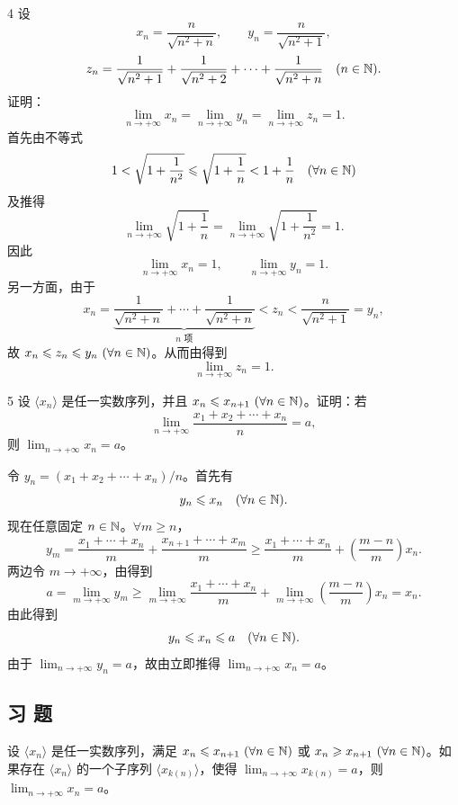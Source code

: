 \begin{sourceexample}{4}
设
\[
x_n=\frac{n}{\sqrt{n^2+n}},\qquad
y_n=\frac{n}{\sqrt{n^2+1}},
\]
\[
z_n=\frac1{\sqrt{n^2+1}}+\frac1{\sqrt{n^2+2}}+\cdots+\frac1{\sqrt{n^2+n}}
\quad(n\in\mathbb{N}).
\]
证明：
\[
\lim_{n\to+\infty}x_n=\lim_{n\to+\infty}y_n=\lim_{n\to+\infty}z_n=1.
\]
首先由不等式
\[
1<\sqrt{1+\frac1{n^2}}\leqslant\sqrt{1+\frac1n}<1+\frac1n
\quad(\forall n\in\mathbb{N})
\]
及推得
\[
\lim_{n\to+\infty}\sqrt{1+\frac1n}
=\lim_{n\to+\infty}\sqrt{1+\frac1{n^2}}=1.
\]
因此
\[
\lim_{n\to+\infty}x_n=1,\qquad \lim_{n\to+\infty}y_n=1.
\]
另一方面，由于
\[
x_n=\underbrace{\frac1{\sqrt{n^2+n}}+\cdots+\frac1{\sqrt{n^2+n}}}_{n\text{ 项}}
<z_n<\frac{n}{\sqrt{n^2+1}}=y_n,
\]
故 \(x_n\leqslant z_n\leqslant y_n\ (\forall n\in\mathbb{N})\)。从而由得到
\[
\lim_{n\to+\infty}z_n=1.
\]
\end{sourceexample}

\begin{sourceexample}{5}
设 \(\langle x_n\rangle\) 是任一实数序列，并且
\(x_n\leqslant x_{n+1}\ (\forall n\in\N)\)。证明：若
\[
\lim_{n\to+\infty}\frac{x_1+x_2+\cdots+x_n}{n}=a,
\]
则 \(\lim_{n\to+\infty}x_n=a\)。

令 \(y_n=(x_1+x_2+\cdots+x_n)/n\)。首先有
\[
y_n\leqslant x_n\quad(\forall n\in\mathbb{N}).
\]
现在任意固定 \(n\in\mathbb{N}\)。\(\forall m\geqslant n\)，
\[
y_m=\frac{x_1+\cdots+x_n}{m}+\frac{x_{n+1}+\cdots+x_m}{m}
\geqslant\frac{x_1+\cdots+x_n}{m}+\left(\frac{m-n}{m}\right)x_n.
\]
两边令 \(m\to+\infty\)，由得到
\[
a=\lim_{m\to+\infty}y_m
\geqslant\lim_{m\to+\infty}\frac{x_1+\cdots+x_n}{m}
+\lim_{m\to+\infty}\left(\frac{m-n}{m}\right)x_n=x_n.
\]
由此得到
\[
y_n\leqslant x_n\leqslant a\quad(\forall n\in\mathbb{N}).
\]
由于 \(\lim_{n\to+\infty}y_n=a\)，故由立即推得
\(\lim_{n\to+\infty}x_n=a\)。
\end{sourceexample}

\subsection*{习 题}

\begin{exercise}
  \item 设 \(\langle x_n\rangle\) 是任一实数序列，满足
  \(x_n\leqslant x_{n+1}\ (\forall n\in\N)\) 或
  \(x_n\geqslant x_{n+1}\ (\forall n\in\mathbb{N})\)。如果存在
  \(\langle x_n\rangle\) 的一个子序列 \(\langle x_{k(n)}\rangle\)，使得
  \(\lim_{n\to+\infty}x_{k(n)}=a\)，则
  \(\lim_{n\to+\infty}x_n=a\)。
\end{exercise}

